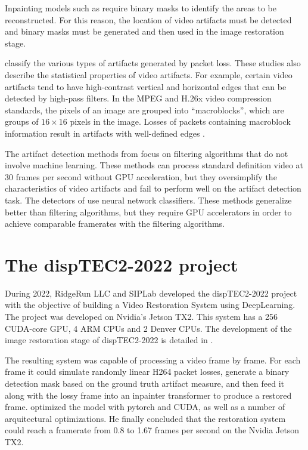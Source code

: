 Inpainting models such as \cite{Li2022} require binary masks to identify the areas to be reconstructed. For this reason, the location of video artifacts must be detected and binary masks must be generated and then used in the image restoration stage.

\cite{Greengrass2009, Glavota2016} classify the various types of artifacts generated by packet loss. These studies also describe the statistical properties of video artifacts. For example, certain video artifacts tend to have high-contrast vertical and horizontal edges that can be detected by high-pass filters. In the MPEG and H.26x video compression standards, the pixels of an image are grouped into ``macroblocks'', which are groups of $16 \times 16$ pixels in the image. Losses of packets containing macroblock information result in artifacts with well-defined edges \cite{Vranjes2019, Glavota2018}.

The artifact detection methods from \cite{Vranjes2018, Glavota2018} focus on filtering algorithms that do not involve machine learning. These methods can process standard definition video at 30 frames per second without GPU acceleration, but they oversimplify the characteristics of video artifacts and fail to perform well on the artifact detection task. The detectors of \cite{Goodall2019, Rajasekar2020} use neural network classifiers. These methods generalize better than filtering algorithms, but they require GPU accelerators in order to achieve comparable framerates with the filtering algorithms.

\section{The dispTEC2-2022 project}
\label{sec:intro_disptec}

During 2022, RidgeRun LLC and SIPLab developed the dispTEC2-2022 project with the objective of building a Video Restoration System using DeepLearning. The project was developed on Nvidia's Jetson TX2. This system has a 256 CUDA-core GPU, 4 ARM CPUs and 2 Denver CPUs. The development of the image restoration stage of dispTEC2-2022 is detailed in \cite{Brenes2022}.

The resulting system was capable of processing a video frame by frame. For each frame it could simulate randomly linear H264 packet losses, generate a binary detection mask based on the ground truth artifact measure, and then feed it along with the lossy frame into an inpainter transformer to produce a restored frame. \cite{Brenes2022} optimized the model with pytorch and CUDA, as well as a number of arquitectural optimizations. He finally concluded that the restoration system could reach a framerate from 0.8 to 1.67 frames per second on the Nvidia Jetson TX2.

